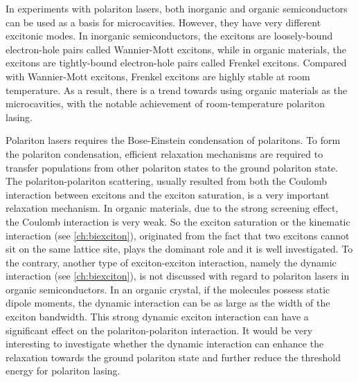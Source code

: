 In experiments with polariton lasers, both inorganic and organic semiconductors can be used as a basis for 
microcavities\cite{pavlos2014}. However, they have very different excitonic modes. In inorganic semiconductors, the 
excitons are  loosely-bound electron-hole pairs called Wannier-Mott excitons, while in organic materials, the excitons are 
tightly-bound electron-hole pairs called Frenkel excitons. Compared with Wannier-Mott excitons, Frenkel excitons are highly
stable at room temperature\cite{lidzey395}. As a result, there is a trend towards using organic materials as the 
microcavities\cite{pavlos2014}, with the notable achievement of room-temperature polariton lasing\cite{plumhof2014, 
daskalakis2014}.

Polariton lasers requires the Bose-Einstein condensation of polaritons. To form the polariton condensation,  efficient 
relaxation mechanisms are required to transfer populations from other polariton states to the ground polariton state.  
The polariton-polariton scattering\cite{ciuti1998, tassone1999}, usually resulted from both the Coulomb interaction between 
excitons and the exciton saturation,  is a very important relaxation mechanism. In organic materials, due to the strong 
screening effect, the Coulomb interaction is very weak. So the exciton saturation or the kinematic interaction (see \autoref{ch:biexciton}), originated from the fact that two excitons
cannot sit on the same lattice site, plays the dominant role and it is well investigated\cite{zoubiKinematic, litinskaya2008, 
bittner2012}. 
To the contrary, another type of exciton-exciton interaction, namely the dynamic interaction (see \autoref{ch:biexciton}), is not discussed with regard to polariton lasers in organic semiconductors. In an organic crystal, if the molecules possess static dipole 
moments, the dynamic interaction can be as large as the width of the exciton bandwidth\cite{agranovich}. This strong 
 dynamic exciton interaction can have a significant effect on the polariton-polariton interaction. It would be very interesting
 to investigate whether the dynamic interaction can enhance the relaxation towards the ground polariton
 state and further reduce the threshold energy for polariton lasing. 
 
